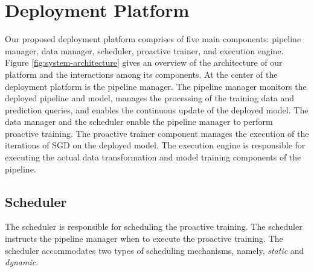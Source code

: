 \section{Deployment Platform} \label{sec:system-architecture}
Our proposed deployment platform comprises of five main components: pipeline manager, data manager, scheduler, proactive trainer, and execution engine.
Figure \ref{fig:system-architecture} gives an overview of the architecture of our platform and the interactions among its components.
At the center of the deployment platform is the pipeline manager.
The pipeline manager monitors the deployed pipeline and model, manages the processing of the training data and prediction queries, and enables the continuous update of the deployed model.
The data manager and the scheduler enable the pipeline manager to perform proactive training.
The proactive trainer component manages the execution of the iterations of SGD on the deployed model.
The execution engine is responsible for executing the actual data transformation and model training components of the pipeline.

\subsection{Scheduler}\label{scheduler}
The scheduler is responsible for scheduling the proactive training.
The scheduler instructs the pipeline manager when to execute the proactive training.
The scheduler accommodates two types of scheduling mechanisms, namely, \textit{static} and \textit{dynamic}.

